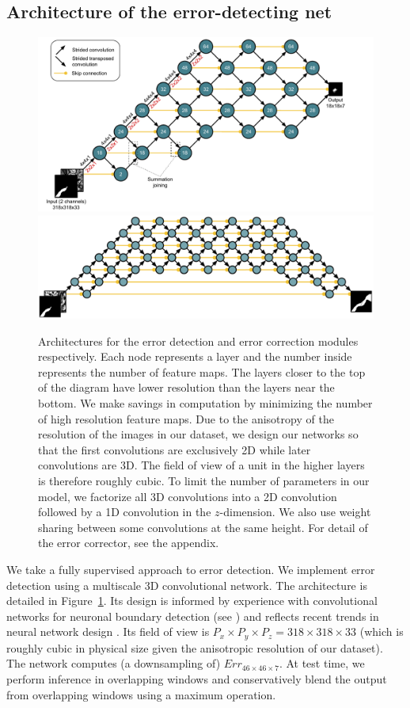 \documentclass{article}
\begin{document}
\subsection{Architecture of the error-detecting net}
\begin{figure}
\centering
\includegraphics[width=1.0\linewidth]{detector.pdf}
\centering
\includegraphics[width=1.0\linewidth]{corrector2.pdf}

\caption{Architectures for the error detection and error correction modules respectively. Each node represents a layer and the number inside represents the number of feature maps. The layers closer to the top of the diagram have lower resolution than the layers near the bottom. We make savings in computation by minimizing the number of high resolution feature maps. Due to the anisotropy of the resolution of the images in our dataset, we design our networks so that the first convolutions are exclusively 2D while later convolutions are 3D. The field of view of a unit in the higher layers is therefore roughly cubic.
To limit the number of parameters in our model, we factorize all 3D convolutions into a 2D convolution followed by a 1D convolution in the $z$-dimension. We also use weight sharing between some convolutions at the same height. For detail of the error corrector, see the appendix.}
\label{fig:architecture}
\end{figure}
We take a fully supervised approach to error detection. We implement error detection using a multiscale 3D convolutional network. The architecture is detailed in Figure~\ref{fig:architecture}. Its design is informed by experience with convolutional networks for neuronal boundary detection (see \cite{kisuk}) and reflects recent trends in neural network design \cite{unet,resnet}. Its field of view is $P_x\times P_y\times P_z=318\times 318\times 33$ (which is roughly cubic in physical size given the anisotropic resolution of our dataset). The network computes (a downsampling of) $Err_{46 \times 46 \times 7}$. At test time, we perform inference in overlapping windows and conservatively blend the output from overlapping windows using a maximum operation.
\end{document}
